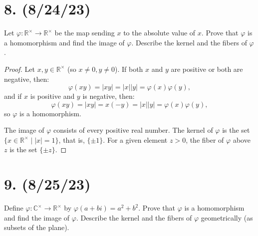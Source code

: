 \documentclass{article}
\begin{document}
\section*{8. (8/24/23)}

Let $\varphi: \mathbb{R}^\times \rightarrow \mathbb{R}^\times$ be the map sending $x$ to the absolute value of $x$. Prove that $\varphi$ is a homomorphism and find the image of $\varphi$. Describe the kernel and the fibers of $\varphi$.

\begin{proof}
    Let $x, y \in \mathbb{R}^\times$ (so $x \neq 0, y \neq 0$). If both $x$ and $y$ are positive or both are negative, then:
    \begin{equation*}
        \varphi(xy) = |xy| = |x| |y| = \varphi(x) \varphi(y),
    \end{equation*}
    and if $x$ is positive and $y$ is negative, then:
    \begin{equation*}
        \varphi(xy) = |xy| = x(-y) = |x||y| = \varphi(x)\varphi(y),
    \end{equation*}
    so $\varphi$ is a homomorphism.

    The image of $\varphi$ consists of every positive real number. The kernel of $\varphi$ is the set $\{ x \in \mathbb{R}^\times \mid |x| = 1 \}$, that is, $\{ \pm 1 \}$. For a given element $z > 0$, the fiber of $\varphi$ above $z$ is the set $\{ \pm z \}$.
\end{proof}

\section*{9. (8/25/23)}

Define $\varphi: \mathbb{C}^\times \rightarrow \mathbb{R}^\times$ by $\varphi(a + bi) = a^2 + b^2$. Prove that $\varphi$ is a homomorphism and find the image of $\varphi$. Describe the kernel and the fibers of $\varphi$ geometrically (as subsets of the plane).
\end{document}
